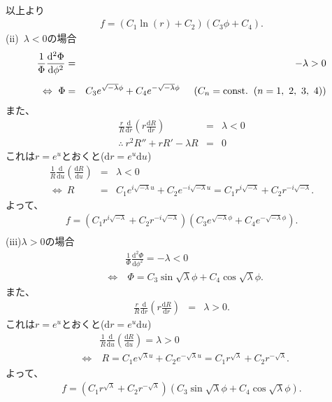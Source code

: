 \documentclass[11pt]{jsarticle}
\begin{document}
\begin{enumerate}
\begin{eqnarray*}
\end{eqnarray*}
%
以上より
\begin{eqnarray*}
f= \left( C_1\ln{(r)} + C_2 \right) \left( C_3 \phi + C_4 \right).
\end{eqnarray*}
%
(ii)\ $\lambda<0$の場合
%
\begin{eqnarray*}
\frac{1}{\Phi}\frac{\mathrm{d}^2 \Phi}{\mathrm{d} \phi^2} &=&
-\lambda>0 \\[5pt]
\Leftrightarrow \ \Phi &=& C_3 e^{\sqrt{-\lambda} \phi} +
C_4 e^{-\sqrt{-\lambda} \phi}  \hspace{0.5cm} (C_n=\mathrm{const.}
\hspace{0.2cm}(n=1,\ 2,\ 3,\ 4))
\end{eqnarray*}
また、
%
\begin{eqnarray*}
\frac{r}{R} \frac{\mathrm{d} }{\mathrm{d} r}
\left(r \frac{\mathrm{d} R}{\mathrm{d} r}\right) &=& \lambda <0 \\[8pt]
\therefore \ r^2R''+rR'-\lambda R &=& 0
\end{eqnarray*}
%
これは$r=e^u$とおくと($\mathrm{d}r=e^u\mathrm{d}u$)
%
\begin{eqnarray*}
\frac{1}{R} \frac{\mathrm{d} }{\mathrm{d} u}
\left( \frac{\mathrm{d} R}{\mathrm{d} u}\right) &=& \lambda<0 \\[8pt]
\Leftrightarrow \ R &=& C_1 e^{i\sqrt{-\lambda} u}
+ C_2 e^{-i\sqrt{-\lambda} u} =
C_1 r^{i\sqrt{-\lambda} } + C_2 r^{-i\sqrt{-\lambda} }.
\end{eqnarray*}
よって、
\begin{eqnarray*}
 f = \left(C_1 r^{i\sqrt{-\lambda} } + C_2 r^{-i\sqrt{-\lambda} } \right)
\left( C_3 e^{\sqrt{-\lambda} \phi}+
C_4 e^{-\sqrt{-\lambda} \phi} \right).\\
\end{eqnarray*}
%
(iii)$\lambda>0$の場合
%
\begin{eqnarray*}
&&\frac{1}{\Phi}\frac{\mathrm{d}^2 \Phi}{\mathrm{d} \phi^2} = -\lambda<0 \\[5pt]
&\Leftrightarrow& \ \Phi = C_3 \sin\sqrt\lambda \phi +
C_4 \cos\sqrt\lambda \phi.
\end{eqnarray*}
%
また、
%
\begin{eqnarray*}
\frac{r}{R} \frac{\mathrm{d} }{\mathrm{d} r}
\left(r \frac{\mathrm{d} R}{\mathrm{d} r}\right) &=& \lambda>0.
\end{eqnarray*}
%
これは$r=e^u$とおくと($\mathrm{d}r=e^u\mathrm{d}u$)
\begin{eqnarray*}
&&\frac{1}{R} \frac{\mathrm{d} }{\mathrm{d} u}
\left( \frac{\mathrm{d} R}{\mathrm{d} u}\right) = \lambda>0 \\[5pt]
&\Leftrightarrow& \ R =
C_1 e^{\sqrt{\lambda} u} + C_2 e^{-\sqrt{\lambda} u} =
C_1 r^{\sqrt\lambda } + C_2 r^{-\sqrt\lambda }.
\end{eqnarray*}
よって、
\begin{eqnarray*}
 f = \left(C_1 r^{\sqrt\lambda } + C_2 r^{-\sqrt\lambda } \right)
\left(C_3 \sin\sqrt\lambda \phi + C_4 \cos\sqrt\lambda \phi \right).
\end{eqnarray*}

\end{enumerate}
\end{document}

